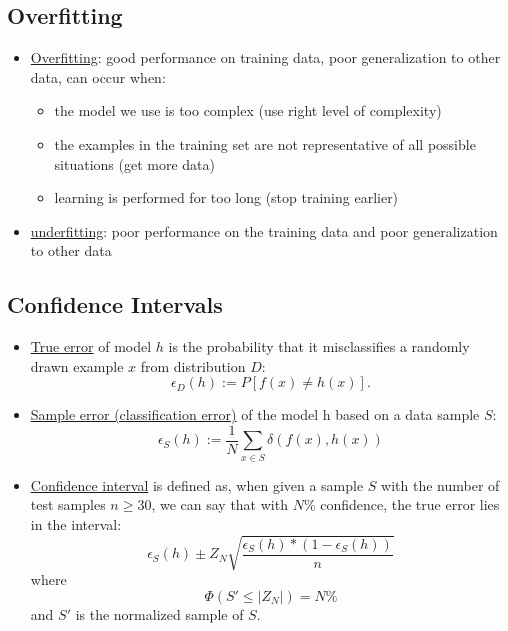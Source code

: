 \documentclass[twocolumn,landscape,10pt]{article}
\theoremstyle{definition}
\begin{document}
\subsection{Overfitting}

\begin{itemize}
    \item \underline{Overfitting}: good performance on training data, poor
        generalization to other data, can occur when:
        \begin{itemize}
            \item the model we use is too complex (use right level of
                complexity)
            \item the examples in the training set are not representative of all
                possible situations (get more data)
            \item learning is performed for too long (stop training earlier)
        \end{itemize} 
    \item \underline{underfitting}: poor performance on the training data and
        poor generalization to other data
\end{itemize} 

\subsection{Confidence Intervals}

\begin{itemize}
    \item \underline{True error} of model $h$ is the probability that it
        misclassifies a randomly drawn example $x$ from distribution $D$:
        \[
            \epsilon_D(h):=P[f(x)\neq h(x)].
        \]
    \item \underline{Sample error (classification error)} of the model h based on a data sample $S$:
        \[
            \epsilon_S(h):=\frac{1}{N}\sum_{x\in S} \delta(f(x),h(x))
        \]
    \item \underline{Confidence interval} is defined as,
        when given a sample $S$ with the number of test samples $n\ge 30$,
        we can say that with $N\%$ confidence,
        the true error lies in the interval:
        \[
            \epsilon_S(h)\pm Z_N\sqrt{\frac{\epsilon_S(h)*(1-\epsilon_S(h))}{n}}
        \]
        where
        \[
            \Phi(S'\le\left|Z_N\right|)=N\%
        \]
        and $S'$ is the normalized sample of $S$.
\end{itemize} 
\end{document}
